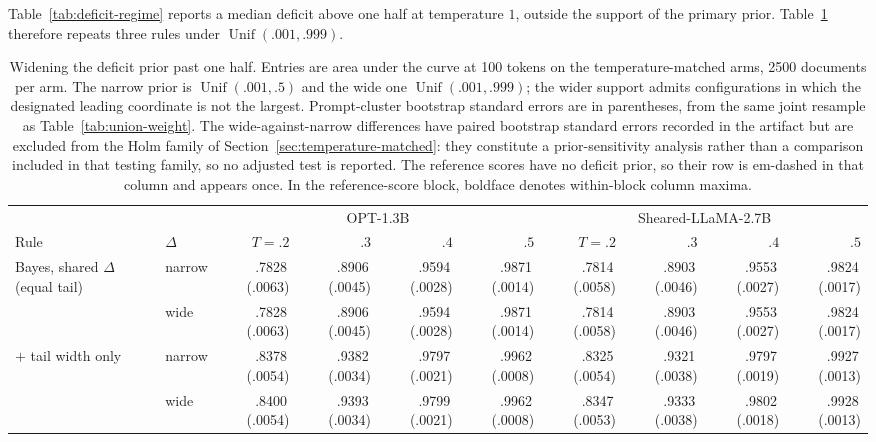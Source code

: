 \documentclass[11pt]{article}
\newcommand{\Unif}{\operatorname{Unif}}
\newcommand{\mcse}[2]{\mbox{#1\,{\fontsize{7}{8}\selectfont(#2)}}}
\begin{document}
Table~\ref{tab:deficit-regime} reports a median deficit above one half at
temperature $1$, outside the support of the primary prior.
Table~\ref{tab:deficit-support} therefore repeats three rules under
$\Unif(.001,.999)$.

\begin{table}[t]
\centering
\scriptsize
\setlength{\tabcolsep}{2pt}%
\caption{Widening the deficit prior past one half.  Entries are area under the curve at 100 tokens on the temperature-matched arms, 2500 documents per arm.  The narrow prior is $\Unif(.001,.5)$ and the wide one $\Unif(.001,.999)$; the wider support admits configurations in which the designated leading coordinate is not the largest.  Prompt-cluster bootstrap standard errors are in parentheses, from the same joint resample as Table~\ref{tab:union-weight}.  The wide-against-narrow differences have paired bootstrap standard errors recorded in the artifact but are excluded from the Holm family of Section~\ref{sec:temperature-matched}: they constitute a prior-sensitivity analysis rather than a comparison included in that testing family, so no adjusted test is reported.  The reference scores have no deficit prior, so their row is em-dashed in that column and appears once.  In the reference-score block, boldface denotes within-block column maxima.}
\label{tab:deficit-support}
\begin{tabular}{@{}llrrrrrrrr@{}}
\toprule
& & \multicolumn{4}{c}{OPT-1.3B} & \multicolumn{4}{c}{Sheared-LLaMA-2.7B} \\
\cmidrule(lr){3-6}\cmidrule(lr){7-10}
Rule & $\Delta$ & $T{=}.2$ & $.3$ & $.4$ & $.5$ & $T{=}.2$ & $.3$ & $.4$ & $.5$ \\
\midrule
Bayes, shared $\Delta$ (equal tail) & narrow & \mcse{.7828}{.0063} & \mcse{.8906}{.0045} & \mcse{.9594}{.0028} & \mcse{.9871}{.0014} & \mcse{.7814}{.0058} & \mcse{.8903}{.0046} & \mcse{.9553}{.0027} & \mcse{.9824}{.0017} \\
 & wide & \mcse{.7828}{.0063} & \mcse{.8906}{.0045} & \mcse{.9594}{.0028} & \mcse{.9871}{.0014} & \mcse{.7814}{.0058} & \mcse{.8903}{.0046} & \mcse{.9553}{.0027} & \mcse{.9824}{.0017} \\
\addlinespace
\quad $+$ tail width only & narrow & \mcse{.8378}{.0054} & \mcse{.9382}{.0034} & \mcse{.9797}{.0021} & \mcse{.9962}{.0008} & \mcse{.8325}{.0054} & \mcse{.9321}{.0038} & \mcse{.9797}{.0019} & \mcse{.9927}{.0013} \\
 & wide & \mcse{.8400}{.0054} & \mcse{.9393}{.0034} & \mcse{.9799}{.0021} & \mcse{.9962}{.0008} & \mcse{.8347}{.0053} & \mcse{.9333}{.0038} & \mcse{.9802}{.0018} & \mcse{.9928}{.0013} \\

\end{tabular}
\end{table}
\end{document}
